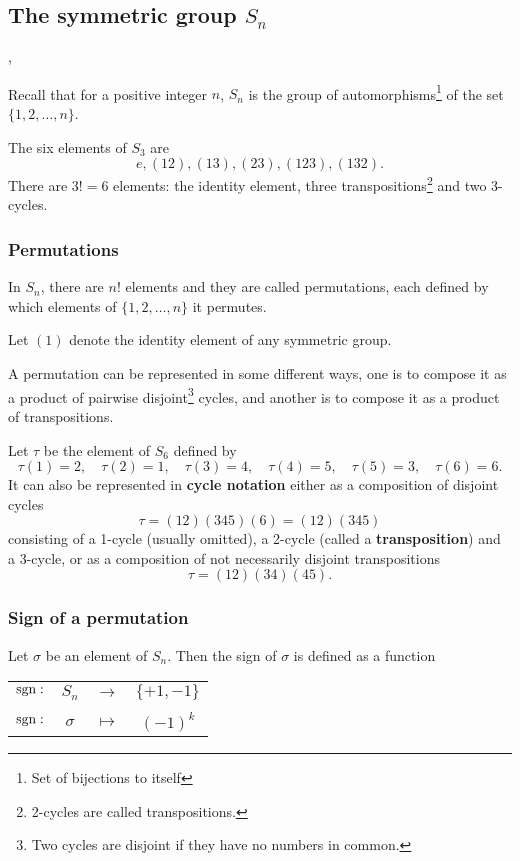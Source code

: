 \subsection{The symmetric group $S_n$}

\cite[1.3]{DummitFoote}, \cite[1.1]{Sagan}

Recall that for a positive integer $n$, $S_n$ is the group of automorphisms\footnote{Set of bijections to itself} of the set $\{1, 2, \dots, n\}$.  

\begin{example}
	The six elements of $S_3$ are 
	\[
		e,(12),(13),(23),(123),(132).
	\]
	There are $3!=6$ elements: the identity element, three transpositions\footnote{2-cycles are called transpositions.} and two 3-cycles.
\end{example}


\subsubsection{Permutations}

	In $S_n$, there are $n!$ elements and they are called permutations, each defined by which elements of $\{1, 2, \dots, n\}$ it permutes.
	
	Let $(1)$ denote the identity element of any symmetric group.
	
	A permutation can be represented in some different ways, one is to compose it as a product of pairwise disjoint\footnote{Two cycles are disjoint if they have no numbers in common.} cycles, and another is to compose it as a product of transpositions.
	
	\begin{example}
		Let $\tau$ be the element of $S_6$ defined by
		\[
			\tau(1) = 2, \quad \tau(2) = 1, \quad \tau(3) = 4, \quad \tau(4) = 5, \quad \tau(5) = 3, \quad \tau(6) = 6.
		\]
		It can also be represented in \textbf{cycle notation} either as a composition of disjoint cycles
		\[
			\tau = (12)(345)(6) = (12)(345)
		\]
		consisting of a 1-cycle (usually omitted), a 2-cycle (called a \textbf{transposition}) and a 3-cycle, or as a composition of not necessarily disjoint transpositions
		\[
			\tau = (12)(34)(45).
		\]
	\end{example}

\subsubsection{Sign of a permutation}

	Let $\sigma$ be an element of $S_n$. Then the sign of $\sigma$ is defined as a function
	\begin{table}[hbt!]\centering\begin{tabular}{c c c c}
			$\text{sgn}:$ & $S_n$    & $\rightarrow$ & $\{+1, -1\}$ \\
			&\rotatebox[origin=c]{90}{$\in$}&&\rotatebox[origin=c]{90}{$\in$} \\
			$\text{sgn}:$ & $\sigma$ & $\mapsto$     & $(-1)^k$
	\end{tabular}\end{table}

